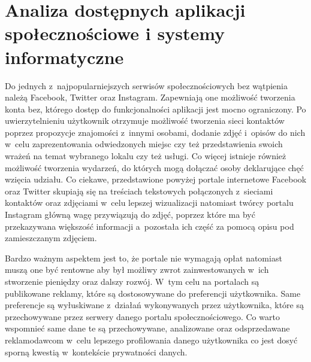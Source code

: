 \documentclass[../Kamil_Kowalewski_Main.tex]{subfiles}
\begin{document}
{    \section{Analiza dostępnych aplikacji społecznościowe i systemy informatyczne}
    \label{chapter2:wprowadzenie_sporty:analiza_aplikacji} {
        Do jednych z~najpopularniejszych serwisów społecznościowych bez wątpienia należą
        Facebook\cite{website:facebook}, Twitter\cite{website:twitter} oraz
        Instagram\cite{website:instagram}. Zapewniają one możliwość tworzenia konta
        bez, którego dostęp do funkcjonalności aplikacji jest mocno ograniczony. Po
        uwierzytelnieniu użytkownik otrzymuje możliwość tworzenia sieci kontaktów
        poprzez propozycje znajomości z~innymi osobami, dodanie zdjęć i~opisów do nich
        w~celu zaprezentowania odwiedzonych miejsc czy też przedstawienia swoich wrażeń
        na temat wybranego lokalu czy też usługi. Co więcej istnieje również możliwość
        tworzenia wydarzeń, do których mogą dołączać osoby deklarujące chęć wzięcia
        udziału. Co ciekawe, przedstawione powyżej portale internetowe Facebook oraz
        Twitter skupiają się na treściach tekstowych połączonych z~sieciami kontaktów
        oraz zdjęciami w~celu lepszej wizualizacji natomiast twórcy portalu Instagram
        główną wagę przywiązują do zdjęć, poprzez które ma być przekazywana większość
        informacji a~pozostała ich część za pomocą opisu pod zamieszczanym zdjęciem.

        Bardzo ważnym aspektem jest to, że portale nie wymagają opłat natomiast muszą
        one być rentowne aby był możliwy zwrot zainwestowanych w~ich stworzenie
        pieniędzy oraz dalszy rozwój. W~tym celu na portalach są publikowane reklamy,
        które są dostosowywane do preferencji użytkownika. Same preferencje są
        wyłuskiwane z~działań wykonywanych przez użytkownika, które są przechowywane
        przez serwery danego portalu społecznościowego. Co warto wspomnieć same dane te są
        przechowywane, analizowane oraz odsprzedawane reklamodawcom w~celu lepszego
        profilowania danego użytkownika co jest dosyć sporną kwestią w~kontekście
        prywatności danych.

}}
\end{document}
